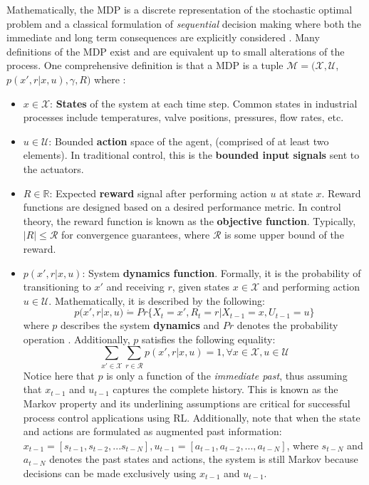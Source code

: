 Mathematically, the MDP is a discrete representation of the stochastic optimal problem and a classical formulation of \textit{sequential} decision making where both the immediate and long term consequences are explicitly considered \cite{bellman1, mdp_bellman}. Many definitions of the MDP exist and are equivalent up to small alterations of the process.  One comprehensive definition is that a MDP is a tuple $\mathcal{M} = (\mathcal{X}, \mathcal{U}$, $p(x', r|x, u), \gamma, R)$ where \cite{ng_ref12}:
\begin{itemize}
    \item $x \in \mathcal{X}$: \textbf{States} of the system at each time step. Common states in industrial processes include temperatures, valve positions, pressures, flow rates, etc.
    \item $u \in \mathcal{U}$: Bounded \textbf{action} space of the agent, (comprised of at least two elements). In traditional control, this is the \textbf{bounded input signals} sent to the actuators.
    \item $R \in \mathbb{R}$: Expected \textbf{reward} signal after performing action $u$ at state $x$. Reward functions are designed based on a desired performance metric.  In control theory, the reward function is known as the \textbf{objective function}.  Typically, $|R| \leq \mathcal{R}$ for convergence guarantees, where $\mathcal{R}$ is some upper bound of the reward.
    \item $p(x', r|x, u)$: System \textbf{dynamics function}. Formally, it is the probability of transitioning to $x'$ and receiving $r$,  given states $x \in \mathcal{X}$ and performing action $u \in \mathcal{U}$. Mathematically, it is described by the following:
    \begin{equation}
        p(x', r | x, u) \dot{=} Pr\{X_t = x', R_t = r | X_{t - 1} = x, U_{t-1} = u\}
        \label{eq:transition_prob}
    \end{equation}
    where $p$ describes the system \textbf{dynamics} and $Pr$ denotes the probability operation \cite{sutton}. Additionally, $p$ satisfies the following equality:
    \begin{equation}
        \sum\limits_{x' \in \mathcal{X}} \sum\limits_{r \in \mathcal{R}} p(x', r | x, u) = 1, \forall x \in \mathcal{X}, u \in \mathcal{U}
        \label{eq:prob}
    \end{equation}
    Notice here that $p$ is only a function of the \textit{immediate past}, thus assuming that $x_{t - 1}$ and $u_{t-1}$ captures the complete history. This is known as the Markov property and its underlining assumptions are critical for successful process control applications using RL. Additionally, note that when the state and actions are formulated as augmented past information: $x_{t-1} = [s_{t-1}, s_{t-2}, ... s_{t-N}], u_{t-1} = [a_{t-1}, a_{t-2}, ..., a_{t-N}]$, where $s_{t-N}$ and $a_{t-N}$ denotes the past states and actions, the system is still Markov because decisions can be made exclusively using $x_{t-1}$ and $u_{t-1}$. 

\end{itemize}
